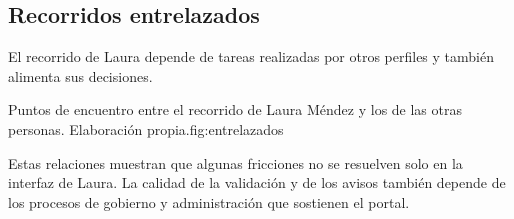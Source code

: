 \subsection{Recorridos entrelazados}\label{sec:entrelazados}

El recorrido de Laura depende de tareas realizadas por otros perfiles y también alimenta sus
decisiones.

  {Puntos de encuentro entre el recorrido de Laura Méndez y los de las otras personas.
   Elaboración propia.}{fig:entrelazados}

\begin{uxlist}
\end{uxlist}

Estas relaciones muestran que algunas fricciones no se resuelven solo en la interfaz de
Laura. La calidad de la validación y de los avisos también depende de los procesos de gobierno
y administración que sostienen el portal.

